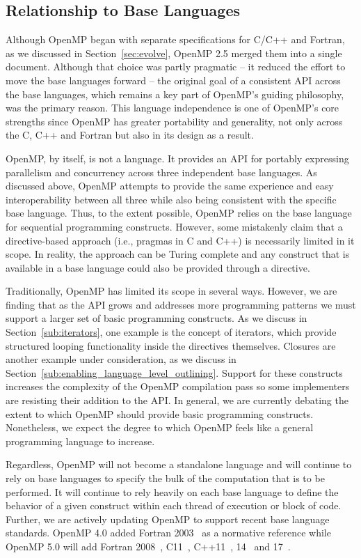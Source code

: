 \subsection{Relationship to Base Languages}
\label{sub:relationship_to_base_languages}

Although OpenMP began with separate specifications for C/C++ and 
Fortran, as we discussed in Section~\ref{sec:evolve}, OpenMP 2.5 
merged them into a single document. Although that choice was
partly pragmatic -- it reduced the effort to move the base languages 
forward -- the original goal of a consistent API across the base 
languages, which remains a key part of OpenMP's guiding philosophy, 
was the primary reason. This language independence is one of OpenMP's 
core strengths since OpenMP has greater portability and generality, 
not only across the C, C++ and Fortran but also in its design as a result. 

OpenMP, by itself, is not a language.  It provides an API for portably
expressing parallelism and concurrency across three independent base languages.
As discussed above, OpenMP attempts to provide the same experience and easy
interoperability between all three while also being consistent with the 
specific base language. Thus, to the extent possible, OpenMP relies on the 
base language for sequential programming constructs. However, some mistakenly 
claim that a directive-based approach (i.e., pragmas in C and C++) is 
necessarily limited in it scope. In reality, the approach can be Turing 
complete and any construct that is available in a base language could also 
be provided through a directive. 

Traditionally, OpenMP has limited its scope in several ways. However, we 
are finding that as the API grows and addresses more programming patterns
we must support a larger set of basic programming constructs. As we
discuss in Section~\ref{sub:iterators}, one example is the concept of 
iterators, which provide structured looping functionality inside the directives
themselves. Closures are another example under consideration, as we discuss in
Section~\ref{sub:enabling_language_level_outlining}. Support for these
constructs increases the complexity of the OpenMP compilation pass so some
implementers are resisting their addition to the API. In general, we are
currently debating the extent to which OpenMP should provide basic programming
constructs. Nonetheless, we expect the degree to which OpenMP feels like a
general programming language to increase.

Regardless, OpenMP will not become a standalone language and will 
continue to rely on base languages to specify the bulk of the
computation that is to be performed. It will continue to rely heavily 
on each base language to define the behavior of a given construct 
within each thread of execution or block of code. Further, we are
actively updating OpenMP to support recent base language standards. 
OpenMP 4.0 added Fortran 2003~\cite{F2003} as a normative reference
while OpenMP 5.0 will add Fortran 2008~\cite{F2008}, C11~\cite{c11}, 
C++11~\cite{c++11}, 14~\cite{c++14} and 17~\cite{c++17}.

